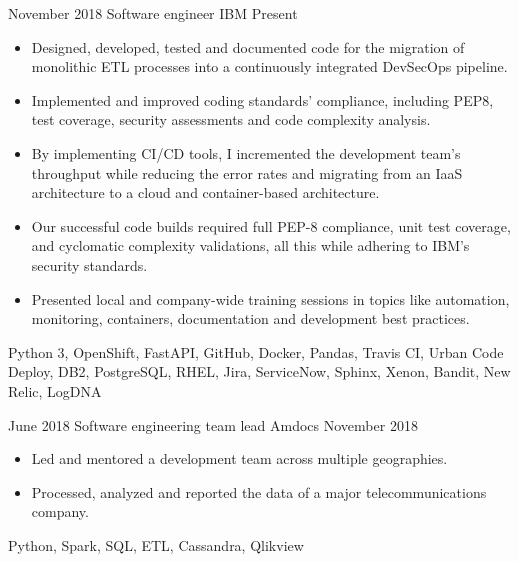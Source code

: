 %
%
%


\begin{experiences}
    \experience
        {November 2018}
        {Software engineer}
        {IBM}
        {Present}
        {
            \begin{itemize}
                \item Designed, developed, tested and documented code for the 
                migration of monolithic ETL processes into a continuously 
                integrated DevSecOps pipeline.
                \item Implemented and improved coding standards' compliance, 
                including PEP8, test coverage, security assessments and code 
                complexity analysis.
                \item By implementing CI/CD tools, I incremented the development 
                team's throughput while reducing the error rates and migrating 
                from an IaaS architecture to a cloud and container-based 
                architecture.
				\item Our successful code builds required full PEP-8 
                compliance, unit test coverage, and cyclomatic complexity 
                validations, all this while adhering to IBM's security 
                standards.
				\item Presented local and company-wide training sessions in 
                topics like automation, monitoring, containers, documentation 
                and development best practices.
            \end{itemize}
        }
        {
            Python 3,
            OpenShift,
            FastAPI,
            GitHub,
            Docker,
            Pandas,
            Travis CI,
            Urban Code Deploy,
            DB2,
            PostgreSQL,
            RHEL,
            Jira,
            ServiceNow,
            Sphinx,
            Xenon,
            Bandit,
            New Relic,
            LogDNA
        }

    \emptySeparator

    \experience
        {June 2018}
        {Software engineering team lead}
        {Amdocs}
        {November 2018}
        {
            \begin{itemize}
                \item Led and mentored a development team across multiple 
                geographies.
                \item Processed, analyzed and reported 
                the data of a major telecommunications company.
            \end{itemize}
        }
        {
            Python,
            Spark,
            SQL,
            ETL,
            Cassandra,
            Qlikview
        }


\end{experiences}

